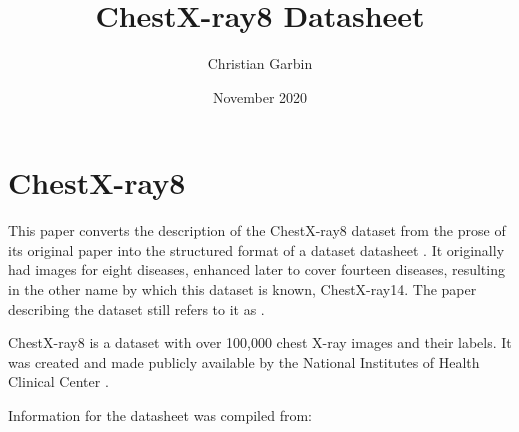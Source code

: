 \documentclass{article}
\title{ChestX-ray8 Datasheet}
\author{Christian Garbin}
\date{November 2020}
\begin{document}
\maketitle

\newcommand{\dssectionheader}[1]{%
   \noindent\framebox[\columnwidth]{%
      {\fontfamily{phv}\selectfont \textbf{\textcolor{blue}{#1}}}
   }
}

\newcommand{\dsquestion}[1]{%
   {\noindent \scriptsize {\fontfamily{phv}\selectfont \textcolor{blue}{\textbf{#1}}}}
}

\newcommand{\dsquestionex}[2]{%
   {\noindent \scriptsize {\fontfamily{phv}\selectfont \textcolor{blue}{\textbf{#1} #2}}}
}

\newcommand{\dsanswer}[1]{%
   {\noindent \footnotesize {#1} \medskip}
}

\section{ChestX-ray8}

This paper converts the description of the ChestX-ray8 dataset \cite{Wang2017} from the prose of its original paper into the structured format of a dataset datasheet \cite{Gebru2018}. It originally had images for eight diseases, enhanced later to cover fourteen diseases, resulting in the other name by which this dataset is known, ChestX-ray14. The paper describing the dataset still refers to it as .

ChestX-ray8 is a dataset with over 100,000 chest X-ray images and their labels. It was created and made publicly available by the National Institutes of Health Clinical Center \cite{Health2017}.

Information for the datasheet was compiled from:
\end{document}

